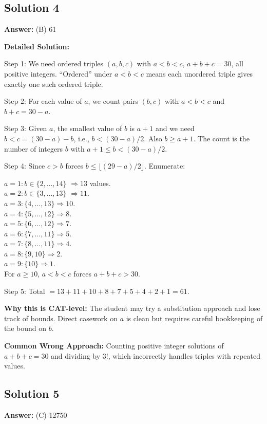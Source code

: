 \documentclass[11pt]{article}
\begin{document}
\subsection*{Solution 4}
\textbf{Answer:} (B) 61

\textbf{Detailed Solution:}

Step 1: We need ordered triples \( (a, b, c) \) with \( a < b < c \), \( a + b + c = 30 \), all positive integers. ``Ordered'' under \( a<b<c \) means each unordered triple gives exactly one such ordered triple.

Step 2: For each value of \( a \), we count pairs \( (b, c) \) with \( a < b < c \) and \( b + c = 30 - a \).

Step 3: Given \( a \), the smallest value of \( b \) is \( a+1 \) and we need \( b < c = (30-a) - b \), i.e., \( b < (30 - a)/2 \). Also \( b \ge a+1 \). The count is the number of integers \( b \) with \( a + 1 \le b < (30 - a)/2 \).

Step 4: Since \( c > b \) forces \( b \le \lfloor (29 - a)/2 \rfloor \). Enumerate:

\( a=1: b \in \{2,\ldots,14\} \) \( \Rightarrow 13 \) values. \\
\( a=2: b \in \{3,\ldots,13\} \) \( \Rightarrow 11 \). \\
\( a=3: \{4,\ldots,13\} \Rightarrow 10 \). \\
\( a=4: \{5,\ldots,12\} \Rightarrow 8 \). \\
\( a=5: \{6,\ldots,12\} \Rightarrow 7 \). \\
\( a=6: \{7,\ldots,11\} \Rightarrow 5 \). \\
\( a=7: \{8,\ldots,11\} \Rightarrow 4 \). \\
\( a=8: \{9,10\} \Rightarrow 2 \). \\
\( a=9: \{10\} \Rightarrow 1 \). \\
For \( a \ge 10 \), \( a < b < c \) forces \( a+b+c > 30 \).

Step 5: Total \( = 13+11+10+8+7+5+4+2+1 = 61 \).

\textbf{Why this is CAT-level:} The student may try a substitution approach and lose track of bounds. Direct casework on \( a \) is clean but requires careful bookkeeping of the bound on \( b \).

\textbf{Common Wrong Approach:} Counting positive integer solutions of \( a + b + c = 30 \) and dividing by \( 3! \), which incorrectly handles triples with repeated values.

\subsection*{Solution 5}
\textbf{Answer:} (C) 12750
\end{document}
